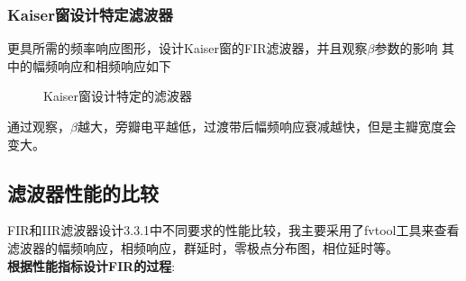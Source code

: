 \documentclass[UTF8]{ctexart}
\begin{document}
\subsubsection{Kaiser窗设计特定滤波器}
更具所需的频率响应图形，设计Kaiser窗的FIR滤波器，并且观察$\beta$参数的影响
其中的幅频响应和相频响应如下
\begin{figure}[H]
	\centering
	\quad
	\caption{Kaiser窗设计特定的滤波器}
\end{figure}
通过观察，$\beta$越大，旁瓣电平越低，过渡带后幅频响应衰减越快，但是主瓣宽度会变大。
\subsection{滤波器性能的比较}
FIR和IIR滤波器设计3.3.1中不同要求的性能比较，我主要采用了fvtool工具来查看滤波器的幅频响应，相频响应，群延时，零极点分布图，相位延时等。\\
\textbf{根据性能指标设计FIR的过程}:
\end{document}
